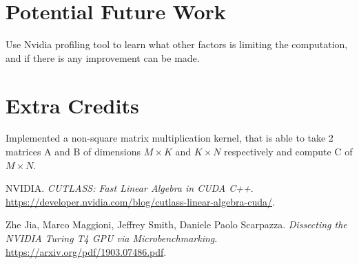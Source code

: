 \documentclass{article}
\begin{document}
\section{Potential Future Work}

Use Nvidia profiling tool to learn what other factors is limiting the computation, and if there is any improvement can be made.

\section{Extra Credits}
Implemented a non-square matrix multiplication kernel, 
that is able to take 2 matrices A and B of dimensions $M \times K$ and $K \times N$ respectively 
and compute C of $M \times N$. 

\begin{thebibliography}{9}
    NVIDIA. \textit{CUTLASS: Fast Linear Algebra in CUDA C++}.
    \url{https://developer.nvidia.com/blog/cutlass-linear-algebra-cuda/}.
    
    Zhe Jia, Marco Maggioni, Jeffrey Smith, Daniele Paolo Scarpazza.
    \textit{Dissecting the NVIDIA Turing T4 GPU via Microbenchmarking}.
    \url{https://arxiv.org/pdf/1903.07486.pdf}.
    
\end{thebibliography}
\end{document}
